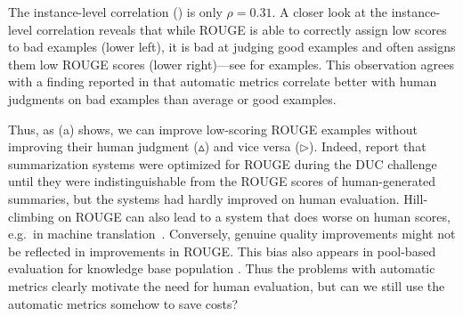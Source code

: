 The instance-level correlation () is only $\rho = 0.31$.
A closer look at the instance-level correlation reveals that
while ROUGE is able to correctly assign low scores to bad examples (lower left),
it is bad at judging good examples and often assigns them low ROUGE scores (lower right)---see  for examples.
This observation agrees with a finding reported in \citet{novikova2017why} that automatic metrics correlate better with human judgments on bad examples than average or good examples. 


Thus, as (a) shows, we can improve low-scoring ROUGE examples without improving their human judgment ($\vartriangle$) and vice versa ($\triangleright$).
Indeed, \citet{conroy2008mind} report that summarization systems were optimized for ROUGE during the DUC challenge~\citep{dang2006overview}
until they were indistinguishable from the ROUGE scores of human-generated summaries, but the systems had hardly improved on human evaluation.
Hill-climbing on ROUGE can also lead to a system that does worse on human scores, e.g.\ in machine translation~\citep{wu2016google}.
Conversely, genuine quality improvements might not be reflected in improvements in ROUGE\@.
This bias also appears in pool-based evaluation for knowledge base population \citep{chaganty2017unbiased}.
Thus the problems with automatic metrics clearly motivate the need for human evaluation,
but can we still use the automatic metrics somehow to save costs?






